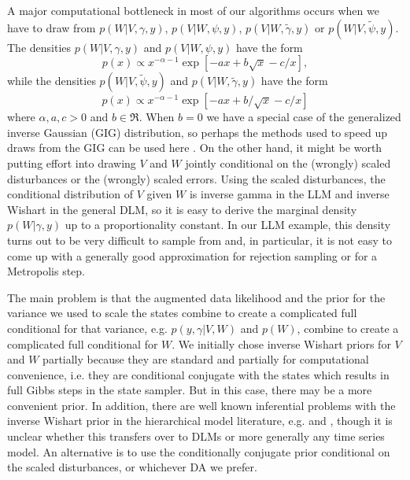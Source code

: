 \documentclass[12pt]{article}
\begin{document}
A major computational bottleneck in most of our algorithms occurs when we have to draw from $p(W|V,\gamma,y)$, $p(V|W,\psi,y)$, $p(V|W,\tilde{\gamma},y)$ or $p(W|V,\tilde{\psi},y)$. The densities $p(W|V,\gamma,y)$ and $p(V|W,\psi,y)$ have the form
\[
p(x)\propto x^{-\alpha-1}\exp\left[-ax + b\sqrt{x} - c/x\right],
\]
while the densities $p(W|V,\tilde{\psi},y)$ and $p(V|W,\tilde{\gamma},y)$ have the form
\[
p(x)\propto x^{-\alpha-1}\exp\left[ -ax + b/\sqrt{x} -c/x\right]
\]
where $\alpha,a,c>0$ and $b\in\Re$. When $b=0$ we have a special case of the generalized inverse Gaussian (GIG) distribution, so perhaps the methods used to speed up draws from the GIG can be used here \citep{jorgensen1982statistical,dagpunar1989easily,devroye2012random}. On the other hand, it might be worth putting effort into drawing $V$ and $W$ jointly conditional on the (wrongly) scaled disturbances or the (wrongly) scaled errors. Using the scaled disturbances, the conditional distribution of $V$ given $W$ is inverse gamma in the LLM and inverse Wishart in the general DLM, so it is easy to derive the marginal density $p(W|\gamma,y)$ up to a proportionality constant. In our LLM example, this density turns out to be very difficult to sample from and, in particular, it is not easy to come up with a generally good approximation for rejection sampling or for a Metropolis step.

The main problem is that the augmented data likelihood and the prior for the variance we used to scale the states combine to create a complicated full conditional for that variance, e.g. $p(y,\gamma|V,W)$ and $p(W)$, combine to create a complicated full conditional for $W$. We initially chose inverse Wishart priors for $V$ and $W$ partially because they are standard and partially for computational convenience, i.e. they are conditional conjugate with the states which results in full Gibbs steps in the state sampler. But in this case, there may be a more convenient prior. In addition, there are well known inferential problems with the inverse Wishart prior in the hierarchical model literature, e.g. \citet{gelman2006prior} and \citet{alvarez2014cov}, though it is unclear whether this transfers over to DLMs or more generally any time series model. An alternative is to use the conditionally conjugate prior conditional on the scaled disturbances, or whichever DA we prefer.
\end{document}
